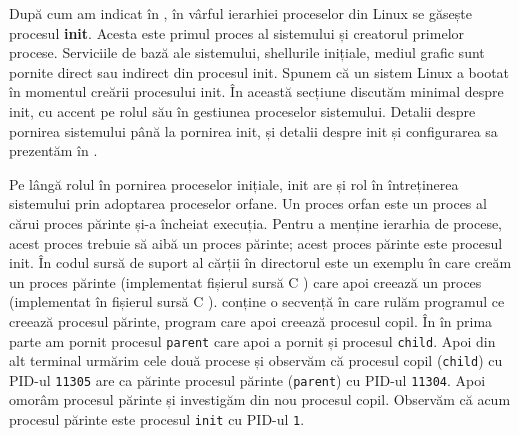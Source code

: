 După cum am indicat în , în vârful ierarhiei proceselor din Linux se găsește procesul \textbf{init}.
Acesta este primul proces al sistemului și creatorul primelor procese.
Serviciile de bază ale sistemului, shellurile inițiale, mediul grafic sunt pornite direct sau indirect din procesul init.
Spunem că un sistem Linux a bootat în momentul creării procesului init.
În această secțiune discutăm minimal despre init, cu accent pe rolul său în gestiunea proceselor sistemului.
Detalii despre pornirea sistemului până la pornirea init, și detalii despre init și configurarea sa prezentăm în .

Pe lângă rolul în pornirea proceselor inițiale, init are și rol în întreținerea sistemului prin adoptarea proceselor orfane.
Un proces orfan este un proces al cărui proces părinte și-a încheiat execuția.
Pentru a menține ierarhia de procese, acest proces trebuie să aibă un proces părinte;
acest proces părinte este procesul init.
În codul sursă de suport al cărții în directorul  este un exemplu în care creăm un proces părinte (implementat fișierul sursă C ) care apoi creează un proces (implementat în fișierul sursă C ).
 conține o secvență în care rulăm programul ce creează procesul părinte, program care apoi creează procesul copil.
În  în prima parte am pornit procesul \texttt{parent} care apoi a pornit și procesul \texttt{child}.
Apoi din alt terminal urmărim cele două procese și observăm că procesul copil (\texttt{child}) cu PID-ul \texttt{11305} are ca părinte procesul părinte (\texttt{parent}) cu PID-ul \texttt{11304}.
Apoi omorâm procesul părinte și investigăm din nou procesul copil.
Observăm că acum procesul părinte este procesul \texttt{init} cu PID-ul \texttt{1}.


